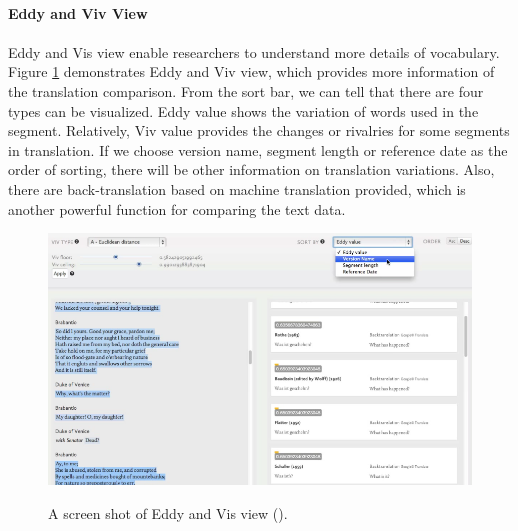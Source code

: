 \paragraph{Eddy and Viv View}
\paragraph[]{}

Eddy and Vis view enable researchers to understand more details of vocabulary. Figure \ref{fig:eddyVivView} demonstrates Eddy and Viv view, which provides more information of the translation comparison. From the sort bar, we can tell that there are four types can be visualized. Eddy value shows the variation of words used in the segment. Relatively, Viv value provides the changes or rivalries for some segments in translation. If we choose version name, segment length or reference date as the order of sorting, there will be other information on translation variations. Also, there are back-translation based on machine translation provided, which is another powerful function for comparing the text data.

\begin{figure}[H] 
	\centering    
	\includegraphics[scale=0.6]{Figs/Eddy-Viv-View}\\[1ex]
	\caption{A screen shot of Eddy and Vis view (\cite{Cheesman2012}).}
	\label{fig:eddyVivView}
\end{figure} 



